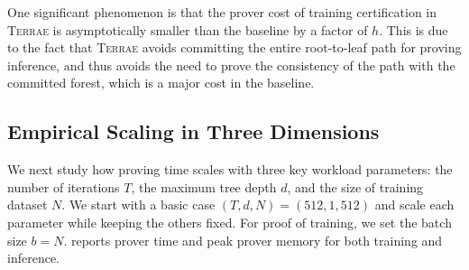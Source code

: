 One significant phenomenon is that the prover cost of training certification in \textsc{Terrae} is asymptotically smaller than the baseline by a factor of $h$.
This is due to the fact that \textsc{Terrae} avoids
committing the entire root-to-leaf path for proving inference, and thus avoids the need to prove the consistency of the path with the committed forest, which is a major cost in the baseline.

\subsection{Empirical Scaling in Three Dimensions}

We next study how proving time scales with three key workload parameters: the
number of iterations $T$, 
the maximum tree depth $d$, 
and the size of training dataset $N$.
We start with a basic case
$(T,d,N)=(512,1,512)$ and scale each parameter while keeping the others fixed.
For proof of training, we set the batch size $b=N$.
 reports prover time and peak prover memory for
both training and inference.

